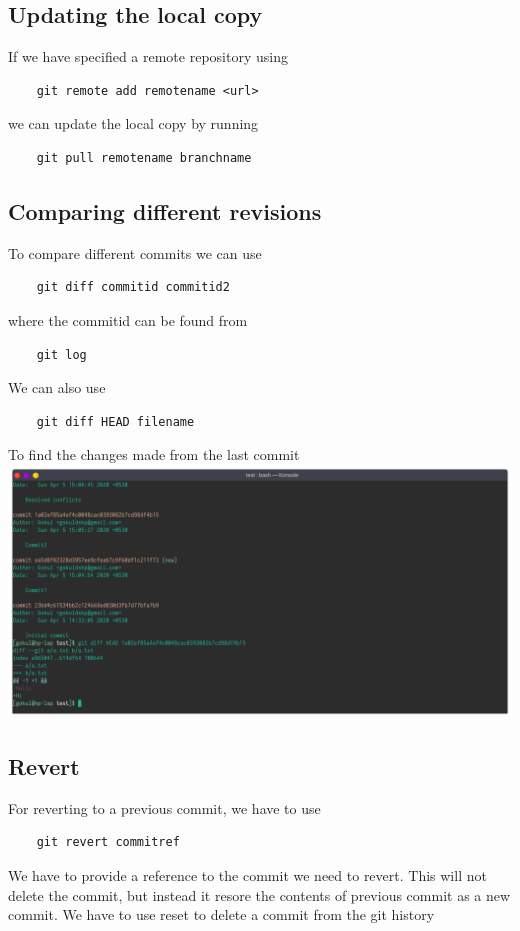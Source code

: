\documentclass{article}
\begin{document}
\subsection{Updating the local copy}
If we have specified a remote repository using \begin{verbatim}
	git remote add remotename <url>
\end{verbatim}
we can update the local copy by running \begin{verbatim}
	git pull remotename branchname

\end{verbatim}
\newpage


\subsection{Comparing different revisions}
To compare different commits we can use \begin{verbatim}
	git diff commitid commitid2
\end{verbatim}
where the commitid can be found from \begin{verbatim}
	git log
\end{verbatim}

We can also use \begin{verbatim}
	git diff HEAD filename
\end{verbatim}
To find the changes made from the last commit\newline
\includegraphics[width=1.2\textwidth]{img/p27/ss7.png}

\newpage
\subsection{Revert}
For reverting to a previous commit, we have to use \begin{verbatim}
	git revert commitref
\end{verbatim}
We have to provide a reference to the commit we need to revert. This will not
delete the commit, but instead it resore the contents of previous commit as a 
new commit.\newline
We have to use reset to delete a commit from the git history
\end{document}
